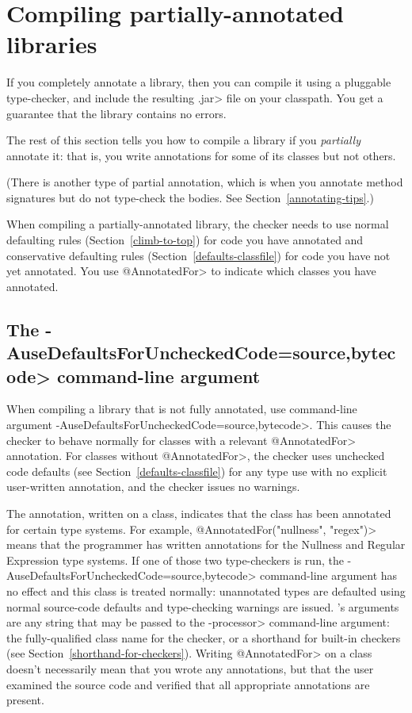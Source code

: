 \section{Compiling partially-annotated libraries\label{compiling-libraries}}

If you completely annotate a library, then you can compile it using a
pluggable type-checker, and include the resulting \<.jar> file on your
classpath.  You get a guarantee that the library contains no errors.

The rest of this section tells you how to compile a library if you
\emph{partially} annotate it:  that is, you write annotations for some of its
classes but not others.

(There is another type of partial annotation, which is when you annotate
method signatures but do not type-check the bodies.
See Section~\ref{annotating-tips}.)

When compiling a partially-annotated library, the checker needs to use normal
defaulting rules (Section~\ref{climb-to-top}) for code you have annotated and
conservative defaulting rules (Section~\ref{defaults-classfile}) for
code you have not yet annotated.
You use \<@AnnotatedFor> to indicate which classes you have annotated.



\subsection{The \<-AuseDefaultsForUncheckedCode=source,bytecode> command-line argument\label{AuseDefaultsForUncheckedCodesource}}

\begin{sloppypar}
When compiling a library that is not fully annotated, use command-line
argument \<-AuseDefaultsForUncheckedCode=source,bytecode>.  This causes
the checker to behave normally for classes with a relevant \<@AnnotatedFor>
annotation.  For classes without \<@AnnotatedFor>, the checker uses
unchecked code defaults
(see Section~\ref{defaults-classfile}) for any type use with no explicit
user-written annotation, and the checker issues no warnings.
\end{sloppypar}

The  annotation, written on a
class, indicates that the class has been annotated for certain type
systems.  For example, \<@AnnotatedFor(\ttlcb"nullness", "regex"\ttrcb)> means that
the programmer has written annotations for the Nullness and Regular
Expression type systems.  If one of those two type-checkers is run,
the \<-AuseDefaultsForUncheckedCode=source,bytecode> command-line argument
has no effect and this class is treated normally:
unannotated types are defaulted using normal source-code
defaults and type-checking warnings are issued.
's arguments are any string that
may be passed to the \<-processor> command-line argument:  the
fully-qualified class name for the checker, or a shorthand for built-in
checkers (see Section~\ref{shorthand-for-checkers}).
Writing \<@AnnotatedFor> on a class doesn't necessarily mean that you wrote
any annotations, but that the user examined the source code and verified
that all appropriate annotations are present.

